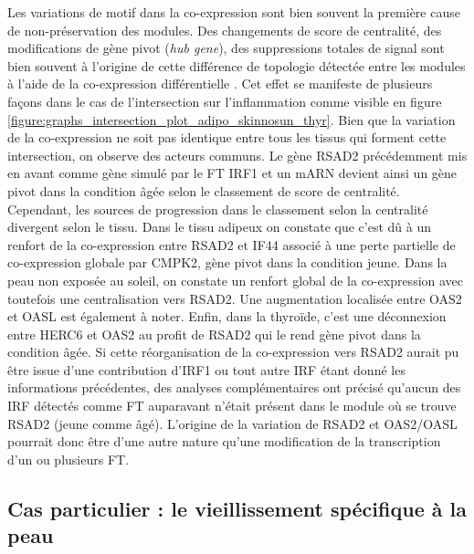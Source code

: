 Les variations de motif dans la co-expression sont bien souvent la première cause de non-préservation des modules. Des changements de score de centralité, des modifications de gène pivot (\textit{hub gene}), des suppressions totales de signal sont bien souvent à l'origine de cette différence de topologie détectée entre les modules à l'aide de la co-expression différentielle . Cet effet se manifeste de plusieurs façons dans le cas de l'intersection sur l'inflammation comme visible en figure \ref{figure:graphs_intersection_plot_adipo_skinnosun_thyr}. Bien que la variation de la co-expression ne soit pas identique entre tous les tissus qui forment cette intersection, on observe des acteurs communs. Le gène RSAD2 précédemment mis en avant comme gène simulé par le FT IRF1 et un mARN devient ainsi un gène pivot dans la condition âgée selon le classement de score de centralité. Cependant, les sources de progression dans le classement selon la centralité divergent selon le tissu. Dans le tissu adipeux on constate que c'est dû à un renfort de la co-expression entre RSAD2 et IF44 associé à une perte partielle de co-expression globale par CMPK2, gène pivot dans la condition jeune. Dans la peau non exposée au soleil, on constate un renfort global de la co-expression avec toutefois une centralisation vers RSAD2. Une augmentation localisée entre OAS2 et OASL est également à noter. Enfin, dans la thyroïde, c'est une déconnexion entre HERC6 et OAS2 au profit de RSAD2 qui le rend gène pivot dans la condition âgée. Si cette réorganisation de la co-expression vers RSAD2 aurait pu être issue d'une contribution d'IRF1 ou tout autre IRF étant donné les informations précédentes, des analyses complémentaires ont précisé qu'aucun des IRF détectés comme FT auparavant n'était présent dans le module où se trouve RSAD2 (jeune comme âgé). L'origine de la variation de RSAD2 et OAS2/OASL pourrait donc être d'une autre nature qu'une modification de la transcription d'un ou plusieurs FT.


\subsection{Cas particulier : le vieillissement spécifique à la peau}

